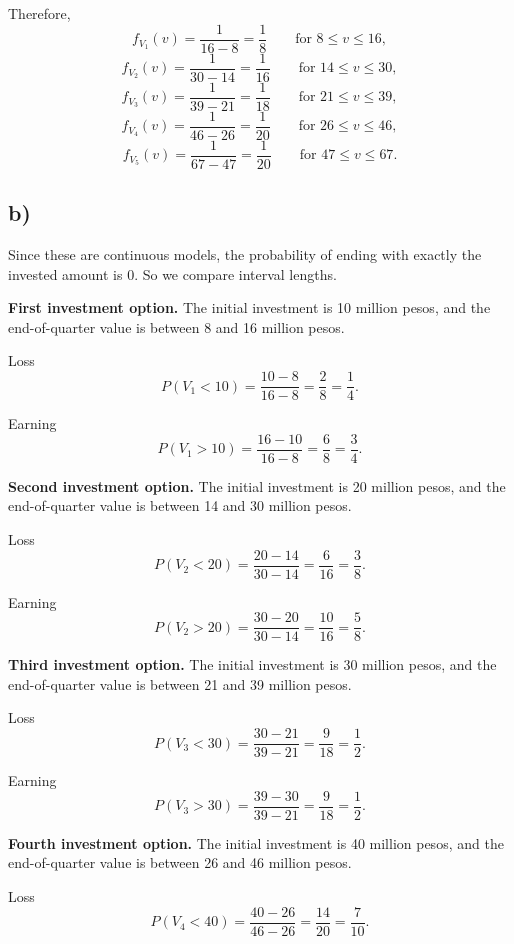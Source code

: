 	Therefore,
	\[
	f_{V_1}(v)=\frac{1}{16-8}=\frac18
	\qquad \text{for }8\le v\le 16,
	\]
	\[
	f_{V_2}(v)=\frac{1}{30-14}=\frac{1}{16}
	\qquad \text{for }14\le v\le 30,
	\]
	\[
	f_{V_3}(v)=\frac{1}{39-21}=\frac{1}{18}
	\qquad \text{for }21\le v\le 39,
	\]
	\[
	f_{V_4}(v)=\frac{1}{46-26}=\frac{1}{20}
	\qquad \text{for }26\le v\le 46,
	\]
	\[
	f_{V_5}(v)=\frac{1}{67-47}=\frac{1}{20}
	\qquad \text{for }47\le v\le 67.
	\]
	
	\subsection*{b)}
	Since these are continuous models, the probability of ending with exactly the invested amount is $0$. So we compare interval lengths.
	
	\medskip
	
	\textbf{First investment option.}
	The initial investment is 10 million pesos, and the end-of-quarter value is between 8 and 16 million pesos.
	
	Loss
	\[
	P(V_1<10)=\frac{10-8}{16-8}=\frac{2}{8}=\frac14.
	\]
	
	Earning
	\[
	P(V_1>10)=\frac{16-10}{16-8}=\frac{6}{8}=\frac34.
	\]
	
	\medskip
	
	\textbf{Second investment option.}
	The initial investment is 20 million pesos, and the end-of-quarter value is between 14 and 30 million pesos.
	
	Loss
	\[
	P(V_2<20)=\frac{20-14}{30-14}=\frac{6}{16}=\frac38.
	\]
	
	Earning
	\[
	P(V_2>20)=\frac{30-20}{30-14}=\frac{10}{16}=\frac58.
	\]
	
	\medskip
	
	\textbf{Third investment option.}
	The initial investment is 30 million pesos, and the end-of-quarter value is between 21 and 39 million pesos.
	
	Loss
	\[
	P(V_3<30)=\frac{30-21}{39-21}=\frac{9}{18}=\frac12.
	\]
	
	Earning
	\[
	P(V_3>30)=\frac{39-30}{39-21}=\frac{9}{18}=\frac12.
	\]
	
	\medskip
	
	\textbf{Fourth investment option.}
	The initial investment is 40 million pesos, and the end-of-quarter value is between 26 and 46 million pesos.
	
	Loss
	\[
	P(V_4<40)=\frac{40-26}{46-26}=\frac{14}{20}=\frac{7}{10}.
	\]
	

